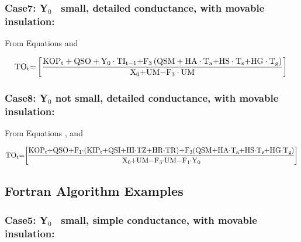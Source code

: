 \subsubsection{Case7: Y\(_{0}\)~ small, detailed conductance, with movable insulation:}\label{case7-yux5f0-small-detailed-conductance-with-movable-insulation}

From Equations and

\begin{equation}
{\rm{T}}{{\rm{O}}_{\rm{t}}}{\rm{ = }}\left[ {\frac{{{\rm{KO}}{{\rm{P}}_{\rm{t}}} + {\rm{QSO}} + {{\rm{Y}}_0}\cdot {\rm{T}}{{\rm{I}}_{{\rm{t - 1}}}}{\rm{ + }}{{\rm{F}}_{\rm{3}}}\left( {{\rm{QSM + HA}}\cdot {{\rm{T}}_{\rm{a}}}{\rm{ + HS}}\cdot {{\rm{T}}_{\rm{s}}}{\rm{ + HG}}\cdot {{\rm{T}}_{\rm{g}}}} \right)}}{{{{\rm{X}}_{\rm{0}}}{\rm{ + UM - }}{{\rm{F}}_{\rm{3}}}\cdot {\rm{UM}}}}} \right]{\rm{  }}
\end{equation}

\subsubsection{Case8: Y\(_{0}\) not small, detailed conductance, with movable insulation:}\label{case8-yux5f0-not-small-detailed-conductance-with-movable-insulation}

From Equations , and

\begin{equation}
\medmuskip=0mu
\thinmuskip=0mu
\thickmuskip=0mu
\nulldelimiterspace=0pt
\scriptspace=0pt
{\rm{T}}{{\rm{O}}_{\rm{t}}}{\rm{ = }}\left[ {\frac{{{\rm{KO}}{{\rm{P}}_{\rm{t}}} + {\rm{QSO}} + {{\rm{F}}_1}\cdot \left( {{\rm{KI}}{{\rm{P}}_{\rm{t}}}{\rm{ + QSI + HI}}\cdot {\rm{TZ + HR}}\cdot {\rm{TR}}} \right){\rm{ + }}{{\rm{F}}_{\rm{3}}}\left( {{\rm{QSM + HA}}\cdot {{\rm{T}}_{\rm{a}}}{\rm{ + HS}}\cdot {{\rm{T}}_{\rm{s}}}{\rm{ + HG}}\cdot {{\rm{T}}_{\rm{g}}}} \right)}}{{{{\rm{X}}_{\rm{0}}}{\rm{ + UM - }}{{\rm{F}}_{\rm{3}}}\cdot {\rm{UM - }}{{\rm{F}}_{\rm{1}}}\cdot {{\rm{Y}}_{\rm{0}}}}}} \right]{\rm{  }}
\end{equation}

\subsection{Fortran Algorithm Examples}\label{fortran-algorithm-examples}

\subsubsection{Case5: Y\(_{0}\)~ small, simple conductance, with movable insulation:}\label{case5-yux5f0-small-simple-conductance-with-movable-insulation-1}

